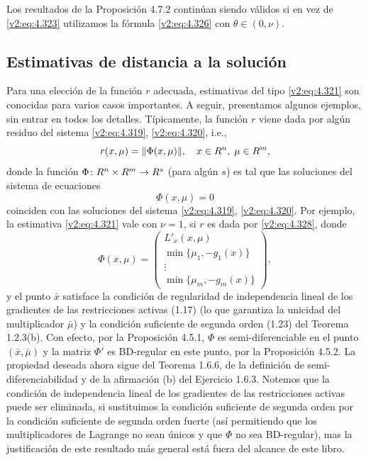 Los resultados de la Proposición 4.7.2 continúan siendo válidos si en vez de \eqref{v2:eq:4.323} utilizamos la fórmula \eqref{v2:eq:4.326} con $\theta \in (0, \nu)$.

\subsection{Estimativas de distancia a la solución}\label{v2:sec:4.7.2}

Para una elección de la función $r$ adecuada, estimativas del tipo \eqref{v2:eq:4.321} son conocidas para varios casos importantes. A seguir, presentamos algunos ejemplos, sin entrar en todos los detalles.
Típicamente, la función $r$ viene dada por algún residuo del sistema \eqref{v2:eq:4.319}, \eqref{v2:eq:4.320}, i.e.,
\begin{equation}
    r(x, \mu) = \|\Phi(x, \mu)\|, \quad x \in R^n, \; \mu \in R^m,
    \label{v2:eq:4.328}
\end{equation}
donde la función $\Phi \colon R^n \times R^m \to R^s$ (para algún $s$) es tal que las soluciones del sistema de ecuaciones
\[
    \Phi(x, \mu) = 0
\]
coinciden con las soluciones del sistema \eqref{v2:eq:4.319}, \eqref{v2:eq:4.320}.
Por ejemplo, la estimativa \eqref{v2:eq:4.321} vale con $\nu = 1$, si $r$ es dada por \eqref{v2:eq:4.328}, donde
\begin{equation}
    \Phi(x, \mu) = \begin{pmatrix} L'_x(x, \mu) \\ \min\{\mu_1, -g_1(x)\} \\ \vdots \\ \min\{\mu_m, -g_m(x)\} \end{pmatrix},
    \label{v2:eq:4.329}
\end{equation}
y el punto $\bar{x}$ satisface la condición de regularidad de independencia lineal de los gradientes de las restricciones activas (1.17) (lo que garantiza la unicidad del multiplicador $\bar{\mu}$) y la condición suficiente de segunda orden (1.23) del Teorema 1.2.3(b). Con efecto, por la Proposición 4.5.1, $\Phi$ es semi-diferenciable en el punto $(\bar{x}, \bar{\mu})$ y la matriz $\Phi'$ es BD-regular en este punto, por la Proposición 4.5.2. La propiedad deseada ahora sigue del Teorema 1.6.6, de la definición de semi-diferenciabilidad y de la afirmación (b) del Ejercicio 1.6.3. Notemos que la condición de independencia lineal de los gradientes de las restricciones activas puede ser eliminada, si sustituimos la condición suficiente de segunda orden por la condición suficiente de segunda orden fuerte (así permitiendo que los multiplicadores de Lagrange no sean únicos y que $\Phi$ no sea BD-regular), mas la justificación de este resultado más general está fuera del alcance de este libro.

